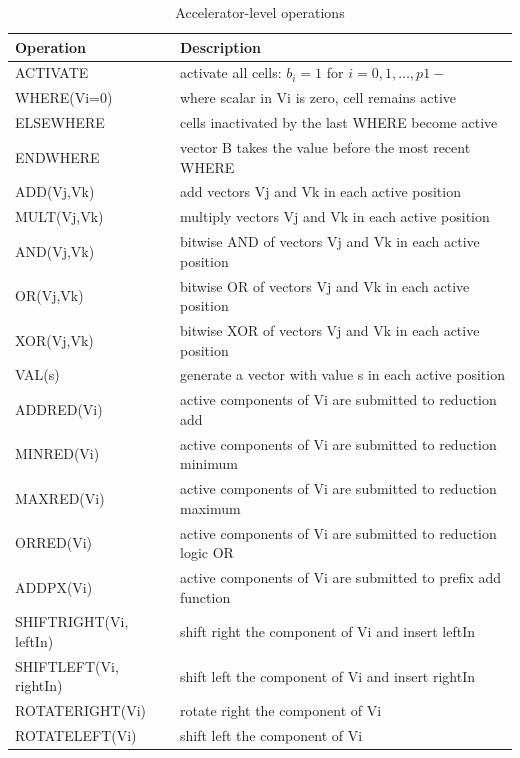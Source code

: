 \begin{table}[h]
	\centering                       
	\caption{Accelerator-level operations}           
	\label{ops}       %

	\begin{tabular}{|l|l|} \hline  %
		Operation & Description  \\ \hline \hline
        ACTIVATE    & activate all cells: $b_i=1$ for $i = 0,1,\ldots ,p1-$ \\ \hline
        WHERE(Vi=0) & where scalar in Vi is zero, cell remains active \\ \hline
        ELSEWHERE & cells inactivated by the last WHERE become active \\ \hline
        ENDWHERE & vector B takes the value before the most recent WHERE \\ \hline
		ADD(Vj,Vk) & add vectors Vj and Vk in each active position   \\ \hline
		MULT(Vj,Vk) & multiply vectors Vj and Vk in each active position   \\ \hline
        AND(Vj,Vk) & bitwise AND of vectors Vj and Vk in each active position  \\ \hline
        OR(Vj,Vk) & bitwise OR of vectors Vj and Vk in each active position  \\ \hline
        XOR(Vj,Vk) & bitwise XOR of vectors Vj and Vk in each active position  \\ \hline
        VAL(s) & generate a vector with value s in each active position \\ \hline
        ADDRED(Vi) & active components of Vi are submitted to reduction add \\ \hline
        MINRED(Vi) & active components of Vi are submitted to reduction minimum \\ \hline
        MAXRED(Vi) & active components of Vi are submitted to reduction maximum \\ \hline
        ORRED(Vi) & active components of Vi are submitted to reduction logic OR \\ \hline
        ADDPX(Vi) & active components of Vi are submitted to prefix add function \\ \hline
        SHIFTRIGHT(Vi, leftIn) & shift right the component of Vi and insert leftIn \\ \hline
        SHIFTLEFT(Vi, rightIn) & shift left the component of Vi and insert rightIn \\ \hline
        ROTATERIGHT(Vi) & rotate right the component of Vi \\ \hline
        ROTATELEFT(Vi) & shift left the component of Vi \\ \hline
	\end{tabular}

\end{table}


